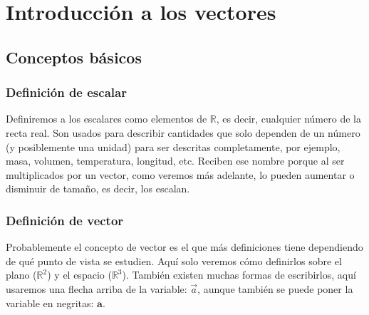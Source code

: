 \documentclass[12pt, fleqn]{report}                             %
\newcommand{\ve}[1]{\vec{#1}}									%
\newcommand{\nve}[1]{\mathbf{#1}}
\begin{document}
\restoregeometry                                                    %
\nopagecolor                                                        %






\tableofcontents{}
\label{sec:Index}

\clearpage




\part{Introducción a los vectores}

	\chapter{Conceptos básicos}
	
		\section{Definición de escalar}
		
		Definiremos a los escalares como elementos de $\mathbb{R}$, es decir, cualquier número de la recta real. Son usados para describir cantidades que solo dependen de un número (y posiblemente una unidad) para ser descritas completamente, por ejemplo, masa, volumen, temperatura, longitud, etc. Reciben ese nombre porque al ser multiplicados por un vector, como veremos más adelante, lo pueden aumentar o disminuir de tamaño, es decir, los escalan.
		
		\section{Definición de vector}
		
		Probablemente el concepto de vector es el que más definiciones tiene dependiendo de qué punto de vista se estudien. Aquí solo veremos cómo definirlos sobre el plano ($\mathbb{R}^2$) y el espacio ($\mathbb{R}^3$). También existen muchas formas de escribirlos, aquí usaremos una flecha arriba de la variable: $\ve{a}$, aunque también se puede poner la variable en negritas: $\nve{a}$.
		
\end{document}
